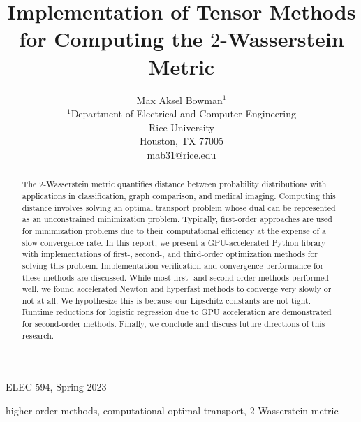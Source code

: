 \documentclass[journal]{IEEEtran}
\begin{document}
\title{Implementation of Tensor Methods for Computing the $2$-Wasserstein Metric}

\author{Max Aksel Bowman$^1$\\$^1$Department of Electrical and Computer Engineering \\ Rice University \\ Houston, TX 77005 \\ mab31@rice.edu}

%
{ELEC 594, Spring 2023}



\maketitle

\begin{abstract}

The $2$-Wasserstein metric quantifies distance between probability distributions with applications in classification, graph comparison, and medical imaging. Computing this distance involves solving an optimal transport problem whose dual can be represented as an unconstrained minimization problem. Typically, first-order approaches are used for minimization problems due to their computational efficiency at the expense of a slow convergence rate. In this report, we present a GPU-accelerated Python library with implementations of first-, second-, and third-order optimization methods for solving this problem. Implementation verification and convergence performance for these methods are discussed. While most first- and second-order methods performed well, we found accelerated Newton and hyperfast methods to converge very slowly or not at all. We hypothesize this is because our Lipschitz constants are not tight. Runtime reductions for logistic regression due to GPU acceleration are demonstrated for second-order methods. Finally, we conclude and discuss future directions of this research.

\end{abstract}


\begin{IEEEkeywords}
higher-order methods, computational optimal transport, $2$-Wasserstein metric
\end{IEEEkeywords}
\end{document}

